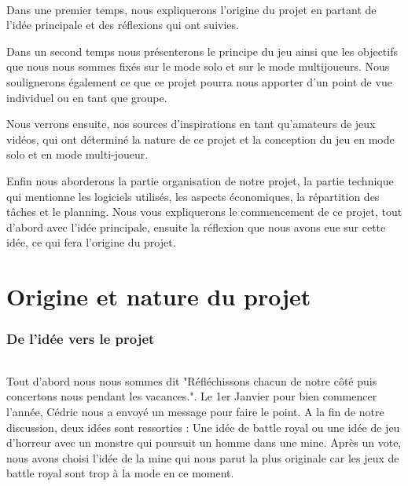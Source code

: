 \documentclass[titlepage, 13px, a4paper]{article}
\begin{document}
\paragraph{} \hspace{0pt} 
Dans une premier temps, nous expliquerons l’origine du projet en partant de l’idée principale 
et des réflexions qui ont suivies.  

Dans un second temps nous présenterons  le principe du jeu ainsi que les objectifs que nous nous 
sommes fixés sur le mode solo et sur le mode multijoueurs. 
Nous soulignerons également ce que ce projet pourra nous apporter d’un point de vue individuel 
ou en tant que groupe.
  
Nous verrons  ensuite, nos sources d’inspirations en tant qu'amateurs de jeux vidéos, 
qui ont déterminé la nature de ce projet et la conception du jeu en mode solo et en mode multi-joueur.  

Enfin nous aborderons la partie organisation de notre projet, la partie technique 
qui mentionne les logiciels utilisés, les aspects économiques, la répartition des tâches et le planning. 
Nous vous expliquerons le commencement de ce projet, tout d'abord avec l'idée principale,  
ensuite la réflexion que nous avons eue sur cette idée, ce qui fera l'origine du projet. 

\newpage

\part{Origine et nature du projet}
\section{De l'idée vers le projet}
\paragraph{} \hspace{0pt}
Tout d'abord nous nous sommes dit "Réfléchissons chacun de notre côté puis  concertons nous pendant les vacances.".
Le 1er Janvier pour bien commencer l'année, Cédric nous a envoyé un message pour faire le point. A la fin de notre discussion, deux idées sont ressorties : 
Une idée de battle royal ou une idée de jeu d'horreur avec un monstre qui poursuit un homme dans une mine.
Après un vote, nous avons choisi l'idée de la mine qui nous parut  la plus originale car les jeux de battle royal sont trop  à la mode en ce moment.
\end{document}
